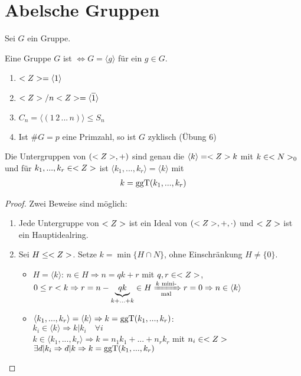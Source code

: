 \section{Abelsche Gruppen}

Sei $G$ ein Gruppe.

\begin{definition}
	Eine Gruppe $G$ ist  $\Leftrightarrow G=\langle g\rangle$ für ein $g\in G$.
\end{definition}

\begin{example}
	\begin{enumerate}[label=(\alph*)]
		\item $<Z>=\langle 1\rangle$
		\item $\whole/n\whole=\langle\overline{1}\rangle$
		\item $C_n=\langle (1\, 2\, ...\, n)\rangle\le S_n$
		\item Ist $\#G=p$ eine Primzahl, so ist $G$ zyklisch (Übung 6)
	\end{enumerate}
\end{example}

\begin{lemma}
	Die Untergruppen von $(<Z>,+)$ sind genau die $\langle k\rangle=<Z> k$ mit $k\in<N>_0$ und für $k_1,...,k_r\in<Z>$ ist $\langle k_1,...,k_r\rangle=\langle k\rangle$ mit
	\begin{align}
		k=\operatorname{ggT}(k_1,...,k_r)\notag
	\end{align}
\end{lemma}
\begin{proof}
	Zwei Beweise sind möglich:
	\begin{enumerate}
		\item Jede Untergruppe von $<Z>$ ist ein Ideal von $(<Z>,+,\cdot)$ und $<Z>$ ist ein Hauptidealring.
		\item Sei $H\le<Z>$. Setze $k=\min\{H\cap N\}$, ohne Einschränkung $H\neq\{0\}$.
		\begin{itemize}
			\item $H=\langle k\rangle$: $n\in H\Rightarrow n=qk+r$ mit $q,r\in<Z>$, $0\le r<k\Rightarrow r=n-\underbrace{qk}_{k+...+k}\in H\xRightarrow[\text{mal}]{k\text{ mini-}}r=0\Rightarrow n\in\langle k\rangle$
			\item $\langle k_1,...,k_r\rangle=\langle k\rangle\Rightarrow k=\operatorname{ggT}(k_1,...,k_r)$: \\
			$k_i\in\langle k\rangle\Rightarrow k\vert k_i\quad\forall i$ \\
			$k\in\langle k_1,...,k_r\rangle\Rightarrow k=n_1k_1+...+n_rk_r$ mit $n_i\in<Z>$ $\exists d\vert k_i\Rightarrow d\vert k\Rightarrow k=\operatorname{ggT}(k_1,...,k_r)$
		\end{itemize}
	\end{enumerate}
\end{proof}

